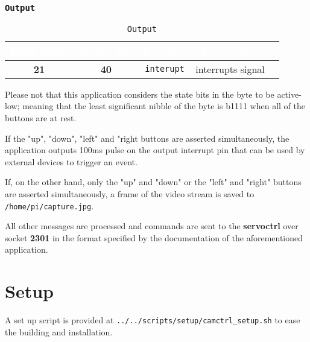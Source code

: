   \subsubsection{\texttt{Output}}
   \begin{table}[!htb]
      \begin{center}
         \begin{tabular}{|c|c|c|c|c|}
            \rowcolor{black}
            \textcolor{white}{\textbf{BCM GPIO}}  &
            \textcolor{white}{\textbf{Header Pin}} &
            \textcolor{white}{\textbf{Function}} &
            \textcolor{white}{\textbf{Description}}\\
            \hline
            \hline
            \textbf{21} & \textbf{40} &
               \texttt{interupt} & interrupts signal \\
            \hline
         \end{tabular}
         \caption{\texttt{Output}}
         \label{table:output}
      \end{center}
   \end{table}

Please not that this application considers the state bits in the byte to be
active-low; meaning that the least significant nibble of the byte is b1111 when
all of the buttons are at rest.

If the "up", "down", "left" and "right buttons are asserted simultaneously, the
application outputs 100ms pulse on the output interrupt pin that can be used by
external devices to trigger an event.

If, on the other hand, only the "up" and "down" or the "left" and "right"
buttons are asserted simultaneously, a frame of the video stream is saved to
\texttt{/home/pi/capture.jpg}.

All other messages are processed and commands are sent to the \textbf{servoctrl}
over socket \textbf{2301} in the format specified by the documentation of the
aforementioned application.

\section{Setup}
A set up script is provided at \texttt{../../scripts/setup/camctrl\_setup.sh}
to ease the building and installation.

